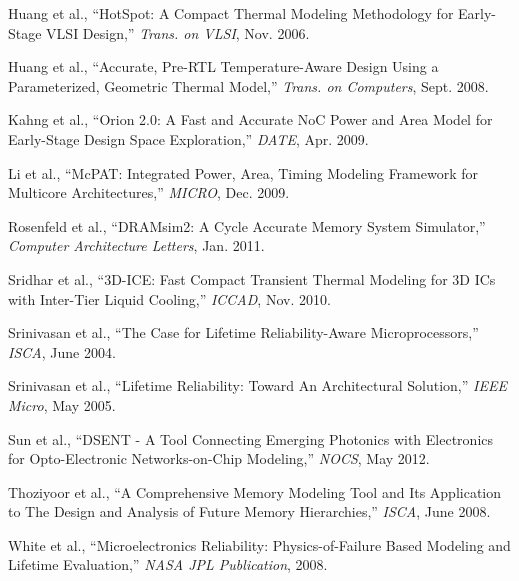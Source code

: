 \begin{thebibliography}{20}
 Huang et al., ``HotSpot: A Compact Thermal Modeling Methodology for Early-Stage VLSI Design,'' \textit{Trans. on VLSI}, Nov. 2006.

 Huang et al., ``Accurate, Pre-RTL Temperature-Aware Design Using a Parameterized, Geometric Thermal Model,'' \textit{Trans. on Computers}, Sept. 2008.

 Kahng et al., ``Orion 2.0: A Fast and Accurate NoC Power and Area Model for Early-Stage Design Space Exploration,'' \textit{DATE}, Apr. 2009.

 Li et al., ``McPAT: Integrated Power, Area, Timing Modeling Framework for Multicore Architectures,'' \textit{MICRO}, Dec. 2009. 

 Rosenfeld et al., ``DRAMsim2: A Cycle Accurate Memory System Simulator,'' \textit{Computer Architecture Letters}, Jan. 2011.

 Sridhar et al., ``3D-ICE: Fast Compact Transient Thermal Modeling for 3D ICs with Inter-Tier Liquid Cooling,'' \textit{ICCAD}, Nov. 2010. 

 Srinivasan et al., ``The Case for Lifetime Reliability-Aware Microprocessors,'' \textit{ISCA}, June 2004.

 Srinivasan et al., ``Lifetime Reliability: Toward An Architectural Solution,'' \textit{IEEE Micro}, May 2005. 

 Sun et al., ``DSENT - A Tool Connecting Emerging Photonics with Electronics for Opto-Electronic Networks-on-Chip Modeling,'' \textit{NOCS}, May 2012.

 Thoziyoor et al., ``A Comprehensive Memory Modeling Tool and Its Application to The Design and Analysis of Future Memory Hierarchies,'' \textit{ISCA}, June 2008.

 White et al., ``Microelectronics Reliability: Physics-of-Failure Based Modeling and Lifetime Evaluation,'' \textit{NASA JPL Publication}, 2008. 

\end{thebibliography}
